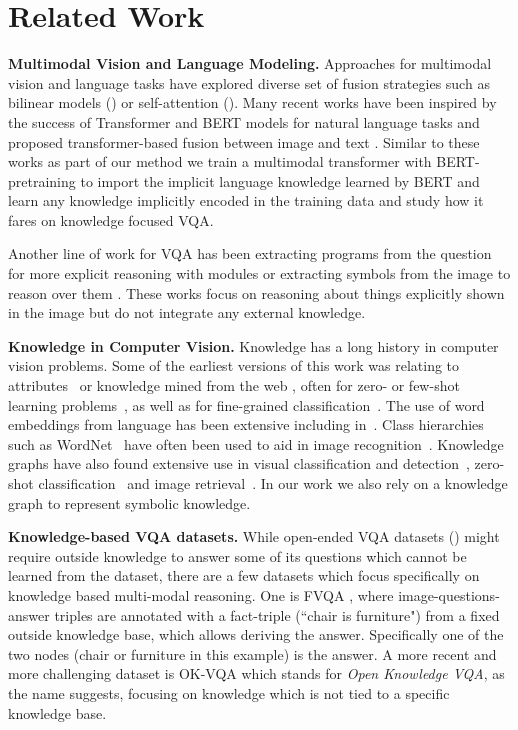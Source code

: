 \documentclass[final]{cvpr}
\providecommand{\myparagraph}[1]{\noindent\textbf{#1.}}
\providecommand{\sectionvspace}{\vspace{-0cm}}
\begin{document}
\section{Related Work}
\sectionvspace
\myparagraph{Multimodal Vision and Language Modeling}
Approaches for multimodal vision and language tasks have explored diverse set of  fusion strategies such as bilinear models (\eg \cite{fukui2016multimodal,kim2018bilinear}) or self-attention (\eg \cite{gao2019dynamic}).
 Many recent works have been inspired by the success of Transformer \cite{vaswani2017attention} and BERT \cite{devlin19bert} models for natural language tasks and   proposed transformer-based fusion between image and text \cite{alberti2019fusion,chen2019uniter,li2019unicoder,li2019visualbert,lu19vilbert,su2019vl,tan2019lxmert,zhou2019unified}.
 Similar to these works
 as part of our method we train a multimodal transformer with BERT-pretraining to import the implicit language knowledge learned by BERT and learn any knowledge implicitly encoded in the training data and study how it fares on knowledge focused VQA.
 
 Another line of work for VQA has been extracting  programs from the question for more explicit reasoning with modules \cite{andreas16} or extracting symbols from the image to reason over them \cite{yi2018neural}. These works focus on reasoning about things explicitly shown in the image but do not integrate any external knowledge.
 
\myparagraph{Knowledge in Computer Vision}
Knowledge has a long history in computer vision problems. Some of the earliest versions of this work was relating to attributes~\cite{Farhadi09, Shrivastava14} or knowledge mined from the web \cite{rohrbach11cvpr}, often for zero- or few-shot learning problems~\cite{FeiFei06, Lampert14,rohrbach13nips}, as well as for fine-grained classification~\cite{Kun12}. The use of word embeddings from language has been extensive including in~\cite{Frome13, kottur2016visual,lu2016visual}. Class hierarchies such as WordNet~\cite{Miller95} have often been used to aid in image recognition~\cite{zhueccv14, redmon2017yolo9000}. Knowledge graphs have also found extensive use in visual classification and detection~\cite{marino17, chen2018iterative}, zero-shot classification~\cite{Wang_zslCVPR2018} and image retrieval~\cite{FeiFei15_2}. In our work we also rely on a knowledge graph to represent symbolic knowledge.

\myparagraph{Knowledge-based VQA datasets}
While open-ended VQA datasets (\eg \cite{antol15}) might require outside knowledge to answer some of its questions which cannot be learned from the dataset,  there are a few datasets which focus specifically on knowledge based multi-modal reasoning. One is FVQA \cite{wang17b}, where image-questions-answer triples are annotated with a fact-triple (\eg  “chair is furniture") from a fixed outside knowledge base, which allows deriving the answer. Specifically one of the two nodes (\ie chair or furniture in this example) is the answer. A more recent and more challenging dataset is OK-VQA \cite{marino19cvpr} which stands for \emph{Open Knowledge VQA}, as the name suggests, focusing on knowledge which is not tied to a specific knowledge base.
\end{document}
